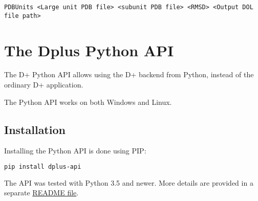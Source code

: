 \documentclass[../D+Manual.tex]{subfiles}
\begin{document}
\texttt{PDBUnits <Large unit PDB file> <subunit PDB file> <RMSD> <Output DOL file path>}

\section{The Dplus Python API}\label{the-dplus-python-api}

The D+ Python API allows using the D+ backend from Python, instead of
the ordinary D+ application.

The Python API works on both Windows and Linux.

\subsection{Installation}\label{installation}

Installing the Python API is done using PIP:

\begin{lstlisting}[language=bash,basicstyle=\small, breaklines= true, breakatwhitespace= true]
pip install dplus-api
\end{lstlisting}

The API was tested with Python 3.5 and newer. More details are provided in a separate \href{https://scholars.huji.ac.il/uriraviv/book/python-api}{README file}.
\end{document}
